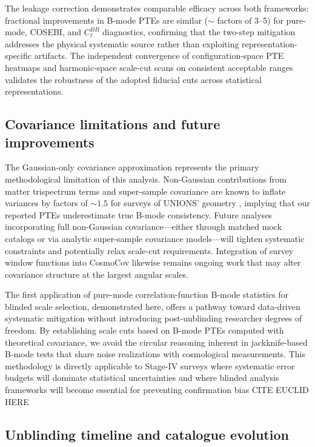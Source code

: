 \documentclass{aa}
\begin{document}
The leakage correction demonstrates comparable efficacy across both frameworks: fractional improvements in B-mode PTEs are similar ($\sim$ factors of \num{3}--\num{5}) for pure-mode, COSEBI, and $C_\ell^{BB}$ diagnostics, confirming that the two-step mitigation addresses the physical systematic source rather than exploiting representation-specific artifacts. The independent convergence of configuration-space PTE heatmaps and harmonic-space scale-cut scans on consistent acceptable ranges validates the robustness of the adopted fiducial cuts across statistical representations.

\subsection{Covariance limitations and future improvements}

The Gaussian-only covariance approximation represents the primary methodological limitation of this analysis. Non-Gaussian contributions from matter trispectrum terms and super-sample covariance are known to inflate variances by factors of $\sim 1.5$ for surveys of UNIONS' geometry \citep{joachimi.etal21}, implying that our reported PTEs underestimate true B-mode consistency. Future analyses incorporating full non-Gaussian covariance—either through matched mock catalogs or via analytic super-sample covariance models—will tighten systematic constraints and potentially relax scale-cut requirements. Integration of survey window functions into CosmoCov likewise remains ongoing work that may alter covariance structure at the largest angular scales.

The first application of pure-mode correlation-function B-mode statistics for blinded scale selection, demonstrated here, offers a pathway toward data-driven systematic mitigation without introducing post-unblinding researcher degrees of freedom. By establishing scale cuts based on B-mode PTEs computed with theoretical covariance, we avoid the circular reasoning inherent in jackknife-based B-mode tests that share noise realizations with cosmological measurements. 
This methodology is directly applicable to Stage-IV surveys where systematic error budgets will dominate statistical uncertainties and where blinded analysis frameworks will become essential for preventing confirmation bias CITE EUCLID HERE

\subsection{Unblinding timeline and catalogue evolution}
\end{document}
